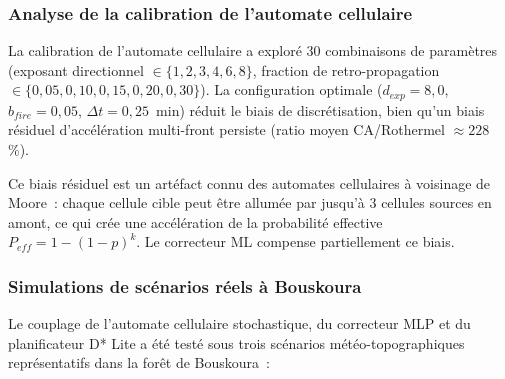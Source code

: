 \subsubsection{Analyse de la calibration de l'automate cellulaire}

La calibration de l'automate cellulaire a exploré 30 combinaisons de paramètres (exposant directionnel $\in \{1, 2, 3, 4, 6, 8\}$, fraction de retro-propagation $\in \{0{,}05, 0{,}10, 0{,}15, 0{,}20, 0{,}30\}$). La configuration optimale ($d_{exp}=8{,}0$, $b_{fire}=0{,}05$, $\Delta t=0{,}25$~min) réduit le biais de discrétisation, bien qu'un biais résiduel d'accélération multi-front persiste (ratio moyen CA/Rothermel $\approx 228$\,\%).

Ce biais résiduel est un artéfact connu des automates cellulaires à voisinage de Moore~: chaque cellule cible peut être allumée par jusqu'à 3 cellules sources en amont, ce qui crée une accélération de la probabilité effective $P_{eff} = 1 - (1-p)^k$. Le correcteur ML compense partiellement ce biais.

\subsubsection{Simulations de scénarios réels à Bouskoura}

Le couplage de l'automate cellulaire stochastique, du correcteur MLP et du planificateur D* Lite a été testé sous trois scénarios météo-topographiques représentatifs dans la forêt de Bouskoura~:

